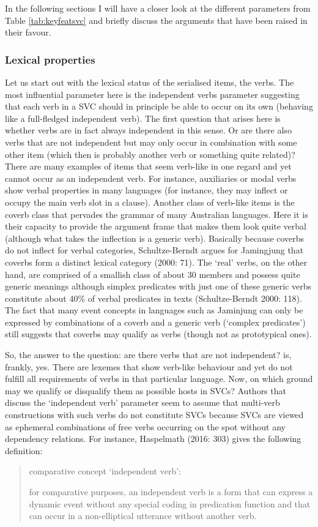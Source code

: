 In the following sections I will have a closer look at the different parameters from Table \ref{tab:keyfeatsvc} and briefly discuss the arguments that have been raised in their favour.

\subsubsection{Lexical properties}\label{sec:lexprop}

Let us start out with the lexical status of the serialised items, the verbs. The most influential parameter here is the independent verbs parameter suggesting that each verb in a SVC should in principle be able to occur on its own (behaving like a full-fledged independent verb). The first question that arises here is whether verbs are in fact always independent in this sense. Or are there also verbs that are not independent but may only occur in combination with some other item (which then is probably another verb or something quite related)? There are many examples of items that seem verb-like in one regard and yet cannot occur as an independent verb. For instance, auxiliaries or modal verbs show verbal properties in many languages (for instance, they may inflect or occupy the main verb slot in a clause). Another class of verb-like items is the coverb class that pervades the grammar of many Australian languages. Here it is their capacity to provide the argument frame that makes them look quite verbal (although what takes the inflection is a generic verb). Basically because coverbs do not inflect for verbal categories, Schultze-Berndt argues for Jamingjung that coverbs form a distinct lexical category (2000: 71). The `real' verbs, on the other hand, are comprised of a smallish class of about 30 members and possess quite generic meanings although simplex predicates with just one of these generic verbs constitute about 40\% of verbal predicates in texts (Schultze-Berndt 2000: 118). The fact that many event concepts in languages such as Jaminjung can only be expressed by combinations of a coverb and a generic verb (`complex predicates') still suggests that coverbs may qualify as verbs (though not as prototypical ones).

So, the answer to the question: are there verbs that are not independent? is, frankly, yes. There are lexemes that show verb-like behaviour and yet do not fulfill all requirements of verbs in that particular language. Now, on which ground may we qualify or disqualify them as possible hosts in SVCs? Authors that discuss the `independent verb' parameter seem to assume that multi-verb constructions with such verbs do not constitute SVCs because SVCs are viewed as ephemeral combinations of free verbs occurring on the spot without any dependency relations. For instance, Haspelmath (2016: 303) gives the following definition: \begin{quote}comparative concept `independent verb’:

for comparative purposes, an independent verb is a form that can express
a dynamic event without any special coding in predication function
and that can occur in a non-elliptical utterance without another verb.\end{quote}

